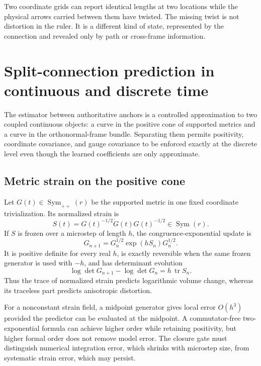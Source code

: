 \documentclass[10pt,twocolumn]{article}
\theoremstyle{definition}
\theoremstyle{remark}
\newcommand{\tr}{\operatorname{tr}}
\begin{document}
\begin{physbox}
Two coordinate grids can report identical lengths at two locations while the
physical arrows carried between them have twisted.  The missing twist is not
distortion in the ruler.  It is a different kind of state, represented by the
connection and revealed only by path or cross-frame information.
\end{physbox}

\section{Split-connection prediction in continuous and discrete time}
\label{app:predictiondetails}

The estimator between authoritative anchors is a controlled approximation to
two coupled continuous objects: a curve in the positive cone of supported
metrics and a curve in the orthonormal-frame bundle.  Separating them permits
positivity, coordinate covariance, and gauge covariance to be enforced
exactly at the discrete level even though the learned coefficients are only
approximate.

\subsection{Metric strain on the positive cone}

Let $G(t)\in\operatorname{Sym}_{++}(r)$ be the supported metric in one fixed
coordinate trivialization.  Its normalized strain is
\begin{equation}
 S(t)=G(t)^{-1/2}\dot G(t)G(t)^{-1/2}\in\operatorname{Sym}(r).
 \label{eq:appnormalizedstrain}
\end{equation}
If $S$ is frozen over a microstep of length $h$, the congruence-exponential
update is
\begin{equation}
 G_{n+1}=G_n^{1/2}\exp(hS_n)G_n^{1/2}.
 \label{eq:appexponentialstep}
\end{equation}
It is positive definite for every real $h$, is exactly reversible when the
same frozen generator is used with $-h$, and has determinant evolution
\begin{equation}
 \log\det G_{n+1}-\log\det G_n=h\,\tr S_n .
 \label{eq:appvolume}
\end{equation}
Thus the trace of normalized strain predicts logarithmic volume change,
whereas its traceless part predicts anisotropic distortion.

For a nonconstant strain field, a midpoint generator gives local error
$O(h^3)$ provided the predictor can be evaluated at the midpoint.  A
commutator-free two-exponential formula can achieve higher order while
retaining positivity, but higher formal order does not remove model error.
The closure gate must distinguish numerical integration error, which shrinks
with microstep size, from systematic strain error, which may persist.
\end{document}
